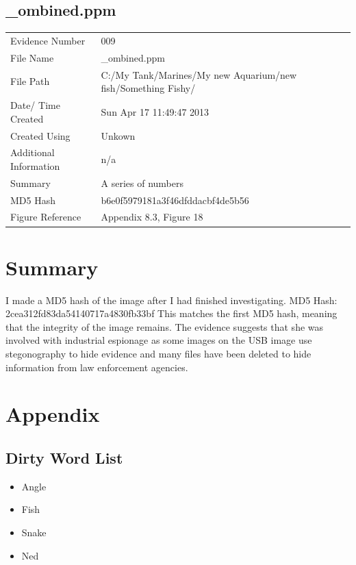 \documentclass[12pt]{article}
\begin{document}
				\subsection{\_ombined.ppm}
					\begin{tabular}{l | p{8cm}}
						Evidence Number & 009  \\
			    			File Name & \_ombined.ppm \\
			      			File Path & C:/My Tank/Marines/My new Aquarium/new fish/Something Fishy/  \\
						Date/ Time Created & Sun Apr 17 11:49:47 2013 \\
						Created Using & Unkown \\
						Additional Information & n/a \\
						Summary & A series of numbers\\
						MD5 Hash & b6e0f5979181a3f46dfddacbf4de5b56 \\
						Figure Reference & Appendix 8.3, Figure 18\\
					\end{tabular}

		\section{Summary}

			I made a MD5 hash of the image after I had finished investigating.  \newline MD5 Hash: 2cea312fd83da54140717a4830fb33bf \newline This matches the first MD5 hash, meaning that the integrity of the image remains.\newline
			The evidence suggests that she was involved with industrial espionage as some images on the USB image use stegonography to hide evidence and many files have been deleted to hide information from law enforcement agencies.

		\section{Appendix}

			\subsection{Dirty Word List}

				\begin{itemize}
					\item Angle
					\item Fish
					\item Snake
					\item Ned
				\end{itemize}
\end{document}

